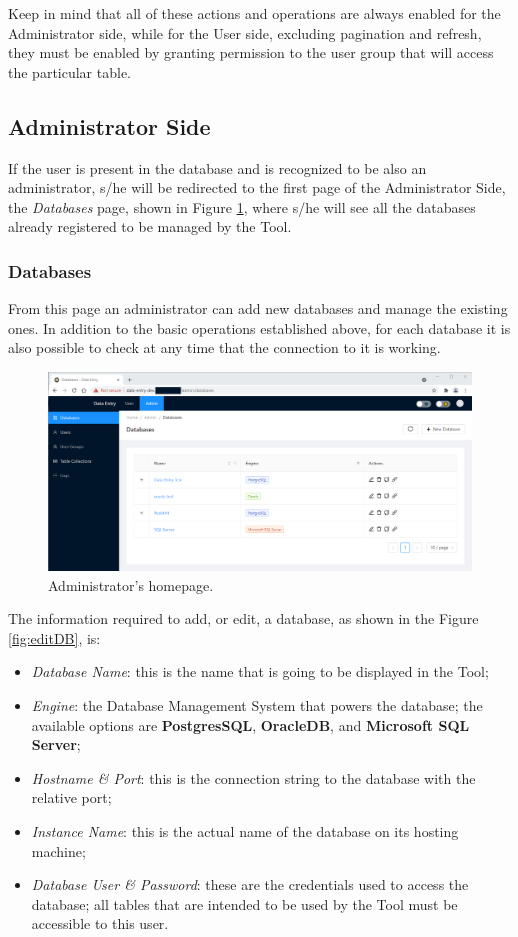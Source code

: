Keep in mind that all of these actions and operations are always enabled for the Administrator side, while for the User side, excluding pagination and refresh, they must be enabled by granting permission to the user group that will access the particular table.

\clearpage

\subsection*{Administrator Side}
If the user is present in the database and is recognized to be also an administrator, s/he will be redirected to the first page of the Administrator Side, the \emph{Databases} page, shown in Figure \ref{fig:adminHome}, where s/he will see all the databases already registered to be managed by the Tool. 

\subsubsection{Databases}
From this page an administrator can add new databases and manage the existing ones. In addition to the basic operations established above, for each database it is also possible to check at any time that the connection to it is working. 

\begin{figure}[!htb]
    \centering
    \includegraphics[width=15.8cm]{chapters/images/ch_3/FE/Admin/admin_section.png}
    \caption{Administrator's homepage.}
    \label{fig:adminHome}
\end{figure}

The information required to add, or edit, a database, as shown in the Figure \ref{fig:editDB}, is:
\begin{itemize}
    \item \emph{Database Name}: this is the name that is going to be displayed in the Tool;
    \item \emph{Engine}: the Database Management System that powers the database; the available options are \textbf{PostgresSQL}, \textbf{OracleDB}, and \textbf{Microsoft SQL Server};
    \item \emph{Hostname \& Port}: this is the connection string to the database with the relative port;
    \item \emph{Instance Name}: this is the actual name of the database on its hosting machine;
    \item \emph{Database User \& Password}: these are the credentials used to access the database; all tables that are intended to be used by the Tool must be accessible to this user.
\end{itemize}

